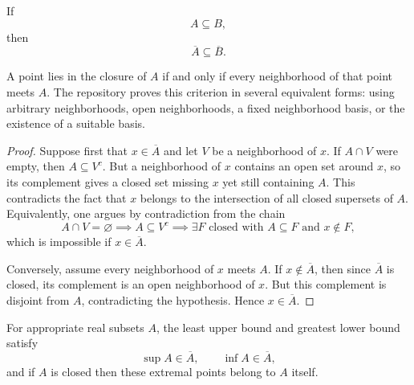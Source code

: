\begin{proposition}\label{prop:closure-mono-4-4}
\leanok
If
\[
A\subseteq B,
\]
then
\[
\overline A\subseteq\overline B.
\]
\end{proposition}

\begin{proposition}\label{prop:closure-neighborhoods-4-5}
\leanok
A point lies in the closure of $A$ if and only if every neighborhood of that point meets $A$.
The repository proves this criterion in several equivalent forms: using arbitrary neighborhoods, open neighborhoods, a fixed neighborhood basis, or the existence of a suitable basis.
\begin{proof}
Suppose first that $x\in\overline A$ and let $V$ be a neighborhood of $x$. If $A\cap V$ were empty, then $A\subseteq V^c$. But a neighborhood of $x$ contains an open set around $x$, so its complement gives a closed set missing $x$ yet still containing $A$. This contradicts the fact that $x$ belongs to the intersection of all closed supersets of $A$.
Equivalently, one argues by contradiction from the chain
\[
A\cap V = \varnothing
\implies
A\subseteq V^c
\implies
\exists F \text{ closed with } A\subseteq F \text{ and } x\notin F,
\]
which is impossible if $x\in\overline A$.

Conversely, assume every neighborhood of $x$ meets $A$. If $x\notin\overline A$, then since $\overline A$ is closed, its complement is an open neighborhood of $x$. But this complement is disjoint from $A$, contradicting the hypothesis. Hence $x\in\overline A$.
\end{proof}
\end{proposition}

\begin{proposition}\label{prop:ssup-sinf-closure-4-6}
\leanok
For appropriate real subsets $A$, the least upper bound and greatest lower bound satisfy
\[
\sup A \in \overline A,
\qquad
\inf A \in \overline A,
\]
and if $A$ is closed then these extremal points belong to $A$ itself.
\end{proposition}

